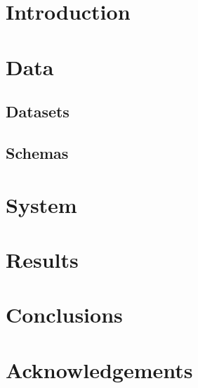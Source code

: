 \documentclass{sigkddExp}
\begin{document}
\section{Introduction}
\blindtext

\section{Data}
\subsection{Datasets}

\blindtext

\subsection{Schemas}

\blindtext

\section{System}
\blindtext

\section{Results}
\blindtext


\section{Conclusions}
\blindtext

\section{Acknowledgements}
\blindtext

\printbibliography

\end{document}
